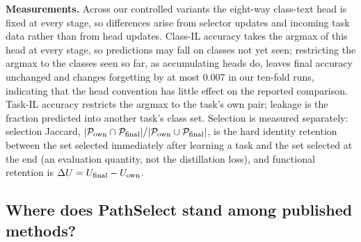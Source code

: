 \documentclass{article}
\newcommand{\Psel}{\mathcal{P}}
\begin{document}
\textbf{Measurements.}
Across our controlled variants the eight-way class-text head is fixed at every stage, so differences arise from selector updates and incoming task data rather than from head updates. Class-IL accuracy takes the argmax of this head at every stage, so predictions may fall on classes not yet seen; restricting the argmax to the classes seen so far, as accumulating heads do, leaves final accuracy unchanged and changes forgetting by at most $0.007$ in our ten-fold runs, indicating that the head convention has little effect on the reported comparison. Task-IL accuracy restricts the argmax to the task's own pair; leakage is the fraction predicted into another task's class set. Selection is measured separately: selection Jaccard, $|\Psel_{\rm own}\cap\Psel_{\rm final}|/|\Psel_{\rm own}\cup\Psel_{\rm final}|$, is the hard identity retention between the set selected immediately after learning a task and the set selected at the end (an evaluation quantity, not the distillation loss), and functional retention is $\Delta U=U_{\rm final}-U_{\rm own}$.

\subsection{Where does PathSelect stand among published methods?}
\label{ssec:sota}
\end{document}
